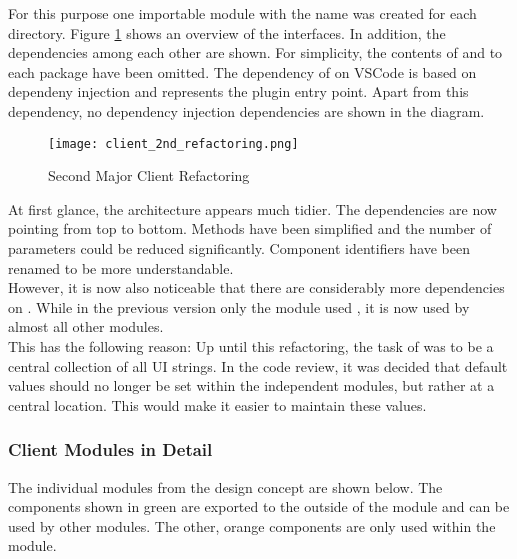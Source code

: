 For this purpose one importable module with the name  was created for each directory.
Figure \ref{fig:client_2nd_refactoring} shows an overview of the interfaces.
In addition, the dependencies among each other are shown.
For simplicity, the contents of  and  to each package have been omitted.
The dependency of  on VSCode is based on dependeny injection and represents the plugin entry point.
Apart from this dependency, no dependency injection dependencies are shown in the diagram. \\

\begin{figure}[H]
    \centering
    \texttt{[image: client\_2nd\_refactoring.png]}
    \caption{Second Major Client Refactoring}
    \label{fig:client_2nd_refactoring}
\end{figure}

At first glance, the architecture appears much tidier.
The dependencies are now pointing from top to bottom.
Methods have been simplified and the number of parameters could be reduced significantly.
Component identifiers have been renamed to be more understandable. \\

However, it is now also noticeable that there are considerably more dependencies on .
While in the previous version only the module  used , it is now used by almost all other modules.\\

This has the following reason: Up until this refactoring, the task of  was to be a central collection of all UI strings.  
In the code review, it was decided that default values should no longer be set within the independent modules,
but rather at a central location.
This would make it easier to maintain these values.

\subsubsection{Client Modules in Detail}
The individual modules from the design concept are shown below.
The components shown in green are exported to the outside of the module and can be used by other modules.
The other, orange components are only used within the module. \\

